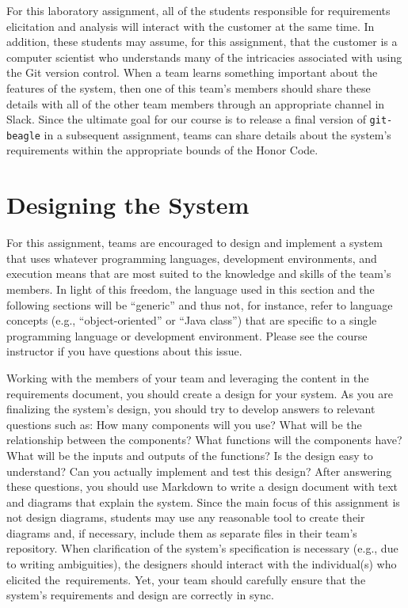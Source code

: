 For this laboratory assignment, all of the students responsible for requirements elicitation and analysis will interact
with the customer at the same time. In addition, these students may assume, for this assignment, that the customer is a
computer scientist who understands many of the intricacies associated with using the Git version control. When a team
learns something important about the features of the system, then one of this team's members should share these details
with all of the other team members through an appropriate channel in Slack. Since the ultimate goal for our course is to
release a final version of {\tt git-beagle} in a subsequent assignment, teams can share details about the system's
requirements within the appropriate bounds of the Honor Code.

\section*{Designing the System}

For this assignment, teams are encouraged to design and implement a system that uses whatever programming languages,
development environments, and execution means that are most suited to the knowledge and skills of the team's members. 
In light of this freedom, the language used in this section and the following sections will be ``generic'' and thus not,
for instance, refer to language concepts (e.g., ``object-oriented'' or ``Java class'') that are specific to a single
programming language or development environment. Please see the course instructor if you have questions about this
issue.

Working with the members of your team and leveraging the content in the requirements document, you should create a
design for your system.  As you are finalizing the system's design, you should try to develop answers to relevant
questions such as: How many components will you use? What will be the relationship between the components? What
functions will the components have? What will be the inputs and outputs of the functions?  Is the design easy to
understand?  Can you actually implement and test this design? After answering these questions, you should use Markdown
to write a design document with text and diagrams that explain the system. Since the main focus of this assignment is
not design diagrams, students may use any reasonable tool to create their diagrams and, if necessary, include them as
separate files in their team's repository. When clarification of the system's specification is necessary (e.g., due to
writing ambiguities), the designers should interact with the individual(s) who elicited \mbox{the requirements}. Yet,
your team should carefully ensure that the system's requirements and design are correctly in sync.

